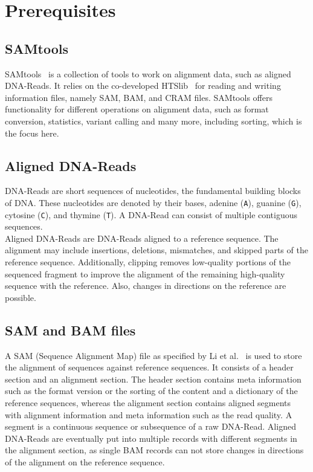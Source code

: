 \section{Prerequisites}

\subsection{SAMtools}
SAMtools~\cite{12ySamtools} is a collection of tools to work on alignment data, such as aligned DNA-Reads. It relies on the co-developed HTSlib~\cite{bonfield_htslib_2021} for reading and writing information files, namely SAM, BAM, and CRAM files. SAMtools offers functionality for different operations on alignment data, such as format conversion, statistics, variant calling and many more, including sorting, which is the focus here. 

\subsection{Aligned DNA-Reads}
DNA-Reads are short sequences of nucleotides, the fundamental building blocks of DNA. These nucleotides are denoted by their bases, adenine (\texttt{A}), guanine (\texttt{G}), cytosine (\texttt{C}), and thymine (\texttt{T}). A DNA-Read can consist of multiple contiguous sequences. \\

Aligned DNA-Reads are DNA-Reads aligned to a reference sequence. The alignment may include insertions, deletions, mismatches, and skipped parts of the reference sequence. Additionally, clipping removes low-quality portions of the sequenced fragment to improve the alignment of the remaining high-quality sequence with the reference. Also, changes in directions on the reference are possible.

\subsection{SAM and BAM files}
A SAM (Sequence Alignment Map) file as specified by Li et al.~\cite{samformat} is used to store the alignment of sequences against reference sequences. It consists of a header section and an alignment section. The header section contains meta information such as the format version or the sorting of the content and a dictionary of the reference sequences, whereas the alignment section contains aligned segments with alignment information and meta information such as the read quality. A segment is a continuous sequence or subsequence of a raw DNA-Read. Aligned DNA-Reads are eventually put into multiple records with different segments in the alignment section, as single BAM records can not store changes in directions of the alignment on the reference sequence.\\

